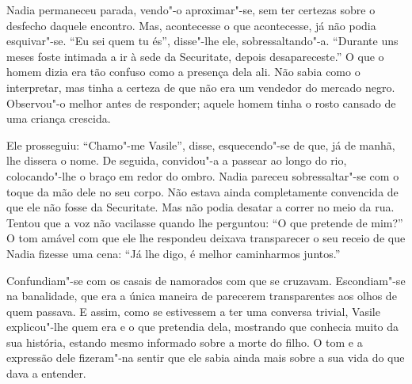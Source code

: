 Nadia permaneceu parada, vendo"-o aproximar"-se, sem ter certezas sobre o
desfecho daquele encontro. Mas, acontecesse o que acontecesse, já não
podia esquivar"-se. ``Eu sei quem tu és'', disse"-lhe ele, sobressaltando"-a.
``Durante uns meses foste intimada a ir à sede da Securitate, depois
desapareceste.'' O que o homem dizia era tão confuso como a presença
dela ali. Não sabia como o interpretar, mas tinha a certeza de que não
era um vendedor do mercado negro. Observou"-o melhor antes de responder;
aquele homem tinha o rosto cansado de uma criança crescida.

Ele prosseguiu: ``Chamo"-me Vasile'', disse, esquecendo"-se de que, já de manhã, lhe dissera o nome. De seguida, convidou"-a a
passear ao longo do rio, colocando"-lhe o braço em redor do ombro. Nadia
pareceu sobressaltar"-se com o toque da mão dele no seu corpo. Não estava
ainda completamente convencida de que ele não fosse da Securitate. Mas
não podia desatar a correr no meio da rua. Tentou que a voz não
vacilasse quando lhe perguntou: ``O que pretende de mim?'' O tom amável
com que ele lhe respondeu deixava transparecer o seu receio de que
Nadia fizesse uma cena: ``Já lhe digo, é melhor caminharmos juntos.''

Confundiam"-se com os casais de namorados com que se cruzavam.
Escondiam"-se na banalidade, que era a única maneira de parecerem
transparentes aos olhos de quem passava. E assim, como se estivessem a
ter uma conversa trivial, Vasile explicou"-lhe quem era e o que pretendia
dela, mostrando que conhecia muito da sua história, estando mesmo
informado sobre a morte do filho. O tom e a expressão dele fizeram"-na
sentir que ele sabia ainda mais sobre a sua vida do que dava a entender.


